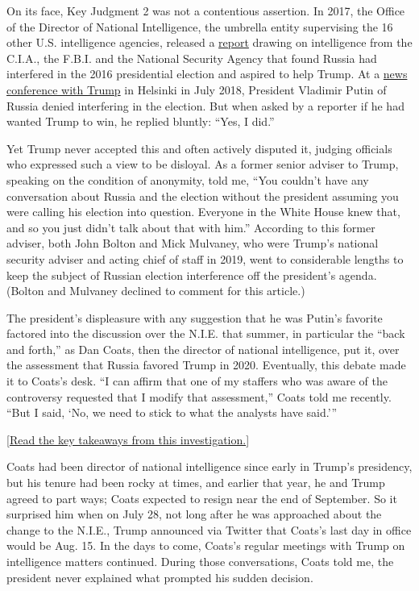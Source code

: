 On its face, Key Judgment 2 was not a contentious assertion. In 2017,
the Office of the Director of National Intelligence, the umbrella entity
supervising the 16 other U.S. intelligence agencies, released a
\href{https://www.nytimes.com/interactive/2017/01/06/us/politics/document-russia-hacking-report-intelligence-agencies.html}{report}
drawing on intelligence from the C.I.A., the F.B.I. and the National
Security Agency that found Russia had interfered in the 2016
presidential election and aspired to help Trump. At a
\href{https://www.nytimes.com/2018/07/16/world/europe/trump-putin-election-intelligence.html}{news
conference with Trump} in Helsinki in July 2018, President Vladimir
Putin of Russia denied interfering in the election. But when asked by a
reporter if he had wanted Trump to win, he replied bluntly: ``Yes, I
did.''

Yet Trump never accepted this and often actively disputed it, judging
officials who expressed such a view to be disloyal. As a former senior
adviser to Trump, speaking on the condition of anonymity, told me, ``You
couldn't have any conversation about Russia and the election without the
president assuming you were calling his election into question. Everyone
in the White House knew that, and so you just didn't talk about that
with him.'' According to this former adviser, both John Bolton and Mick
Mulvaney, who were Trump's national security adviser and acting chief of
staff in 2019, went to considerable lengths to keep the subject of
Russian election interference off the president's agenda. (Bolton and
Mulvaney declined to comment for this article.)

The president's displeasure with any suggestion that he was Putin's
favorite factored into the discussion over the N.I.E. that summer, in
particular the ``back and forth,'' as Dan Coats, then the director of
national intelligence, put it, over the assessment that Russia favored
Trump in 2020. Eventually, this debate made it to Coats's desk. ``I can
affirm that one of my staffers who was aware of the controversy
requested that I modify that assessment,'' Coats told me recently. ``But
I said, `No, we need to stick to what the analysts have said.'''

{[}\href{https://www.nytimes.com/2020/08/08/us/politics/trump-russia.html?action=click\&module=Top\%20Stories\&pgtype=Homepage}{Read
the key takeaways from this investigation.}{]}

Coats had been director of national intelligence since early in Trump's
presidency, but his tenure had been rocky at times, and earlier that
year, he and Trump agreed to part ways; Coats expected to resign near
the end of September. So it surprised him when on July 28, not long
after he was approached about the change to the N.I.E., Trump announced
via Twitter that Coats's last day in office would be Aug. 15. In the
days to come, Coats's regular meetings with Trump on intelligence
matters continued. During those conversations, Coats told me, the
president never explained what prompted his sudden decision.

